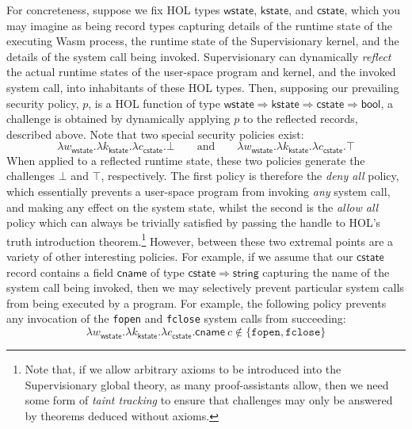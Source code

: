 \documentclass[a4paper, UKenglish, cleveref, autoref, thm-restate, colorlinks]{lipics-v2021}
\newcommand{\lam}[1]{\lambda{#1}.}
\begin{document}
For concreteness, suppose we fix HOL types $\mathsf{wstate}$, $\mathsf{kstate}$, and $\mathsf{cstate}$, which you may imagine as being record types capturing details of the runtime state of the executing Wasm process, the runtime state of the Supervisionary kernel, and the details of the system call being invoked.
Supervisionary can dynamically \emph{reflect} the actual runtime states of the user-space program and kernel, and the invoked system call, into inhabitants of these HOL types.
Then, supposing our prevailing security policy, $p$, is a HOL function of type $\mathsf{wstate} \Rightarrow \mathsf{kstate} \Rightarrow \mathsf{cstate} \Rightarrow \mathsf{bool}$, a challenge is obtained by dynamically applying $p$ to the reflected records, described above.
Note that two special security policies exist:
\begin{displaymath}
\lam{w_{\mathsf{wstate}}}\lam{k_{\mathsf{kstate}}}\lam{c_{\mathsf{cstate}}}\bot \qquad\text{and}\qquad \lam{w_{\mathsf{wstate}}}\lam{k_{\mathsf{kstate}}}\lam{c_{\mathsf{cstate}}}\top
\end{displaymath}
When applied to a reflected runtime state, these two policies generate the challenges $\bot$ and $\top$, respectively.
The first policy is therefore the \emph{deny all} policy, which essentially prevents a user-space program from invoking \emph{any} system call, and making any effect on the system state, whilst the second is the \emph{allow all} policy which can always be trivially satisfied by passing the handle to HOL's truth introduction theorem.\footnote{Note that, if we allow arbitrary axioms to be introduced into the Supervisionary global theory, as many proof-assistants allow, then we need some form of \emph{taint tracking} to ensure that challenges may only be answered by theorems deduced without axioms.}
However, between these two extremal points are a variety of other interesting policies.
For example, if we assume that our $\mathsf{cstate}$ record contains a field $\mathsf{cname}$ of type $\mathsf{cstate} \Rightarrow \mathsf{string}$ capturing the name of the system call being invoked, then we may selectively prevent particular system calls from being executed by a program.
For example, the following policy prevents any invocation of the \texttt{fopen} and \texttt{fclose} system calls from succeeding:
\begin{displaymath}
\lam{w_{\mathsf{wstate}}}\lam{k_{\mathsf{kstate}}}\lam{c_{\mathsf{cstate}}}\mathsf{cname}\ c \notin \{ \mathtt{fopen}, \mathtt{fclose} \}
\end{displaymath}
\end{document}
